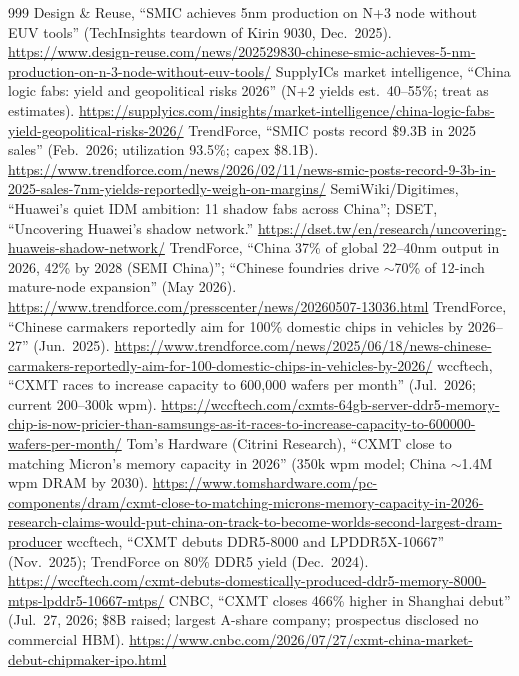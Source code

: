 \begin{thebibliography}{999}
 Design \& Reuse, ``SMIC achieves 5nm production on N+3 node without EUV tools'' (TechInsights teardown of Kirin 9030, Dec.\ 2025). \url{https://www.design-reuse.com/news/202529830-chinese-smic-achieves-5-nm-production-on-n-3-node-without-euv-tools/}
 SupplyICs market intelligence, ``China logic fabs: yield and geopolitical risks 2026'' (N+2 yields est.\ 40--55\%; treat as estimates). \url{https://supplyics.com/insights/market-intelligence/china-logic-fabs-yield-geopolitical-risks-2026/}
 TrendForce, ``SMIC posts record \$9.3B in 2025 sales'' (Feb.\ 2026; utilization 93.5\%; capex \$8.1B). \url{https://www.trendforce.com/news/2026/02/11/news-smic-posts-record-9-3b-in-2025-sales-7nm-yields-reportedly-weigh-on-margins/}
 SemiWiki/Digitimes, ``Huawei's quiet IDM ambition: 11 shadow fabs across China''; DSET, ``Uncovering Huawei's shadow network.'' \url{https://dset.tw/en/research/uncovering-huaweis-shadow-network/}
 TrendForce, ``China 37\% of global 22--40nm output in 2026, 42\% by 2028 (SEMI China)''; ``Chinese foundries drive $\sim$70\% of 12-inch mature-node expansion'' (May 2026). \url{https://www.trendforce.com/presscenter/news/20260507-13036.html}
 TrendForce, ``Chinese carmakers reportedly aim for 100\% domestic chips in vehicles by 2026--27'' (Jun.\ 2025). \url{https://www.trendforce.com/news/2025/06/18/news-chinese-carmakers-reportedly-aim-for-100-domestic-chips-in-vehicles-by-2026/}
 wccftech, ``CXMT races to increase capacity to 600,000 wafers per month'' (Jul.\ 2026; current 200--300k wpm). \url{https://wccftech.com/cxmts-64gb-server-ddr5-memory-chip-is-now-pricier-than-samsungs-as-it-races-to-increase-capacity-to-600000-wafers-per-month/}
 Tom's Hardware (Citrini Research), ``CXMT close to matching Micron's memory capacity in 2026'' (350k wpm model; China $\sim$1.4M wpm DRAM by 2030). \url{https://www.tomshardware.com/pc-components/dram/cxmt-close-to-matching-microns-memory-capacity-in-2026-research-claims-would-put-china-on-track-to-become-worlds-second-largest-dram-producer}
 wccftech, ``CXMT debuts DDR5-8000 and LPDDR5X-10667'' (Nov.\ 2025); TrendForce on 80\% DDR5 yield (Dec.\ 2024). \url{https://wccftech.com/cxmt-debuts-domestically-produced-ddr5-memory-8000-mtps-lpddr5-10667-mtps/}
 CNBC, ``CXMT closes 466\% higher in Shanghai debut'' (Jul.\ 27, 2026; \$8B raised; largest A-share company; prospectus disclosed no commercial HBM). \url{https://www.cnbc.com/2026/07/27/cxmt-china-market-debut-chipmaker-ipo.html}

\end{thebibliography}
